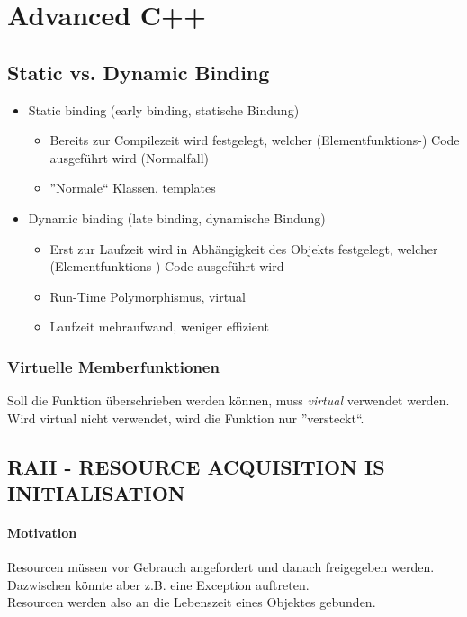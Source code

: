 \section{Advanced C++}

\subsection{Static vs. Dynamic Binding}
\begin{itemize}
	\item Static binding (early binding, statische Bindung)
		\begin{itemize}
			\item Bereits zur Compilezeit wird festgelegt, welcher (Elementfunktions-) Code
				ausgeführt wird (Normalfall)
			\item ''Normale`` Klassen, templates
		\end{itemize}
	\item Dynamic binding (late binding, dynamische Bindung)
		\begin{itemize}
			\item Erst zur Laufzeit wird in Abhängigkeit des Objekts festgelegt, welcher
				(Elementfunktions-) Code ausgeführt wird
			\item Run-Time Polymorphismus, virtual
			\item Laufzeit mehraufwand, weniger effizient
		\end{itemize}
\end{itemize}

\subsubsection{Virtuelle Memberfunktionen}

Soll die Funktion überschrieben werden können, muss \emph{virtual} verwendet werden.
Wird virtual nicht verwendet, wird die Funktion nur ''versteckt``.



\subsection[RAII]{RAII - RESOURCE ACQUISITION IS INITIALISATION}

\paragraph{Motivation}
Resourcen müssen vor Gebrauch angefordert und danach freigegeben werden.
Dazwischen könnte aber z.B. eine Exception auftreten.\\
Resourcen werden also an die Lebenszeit eines Objektes gebunden. 

